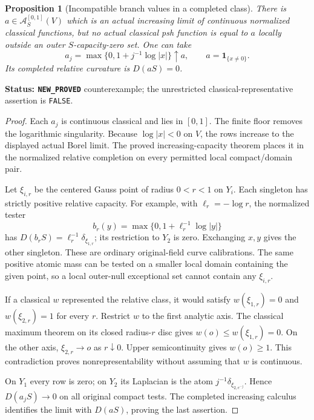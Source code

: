 \documentclass[11pt,a4paper]{article}
\numberwithin{equation}{section}
\newtheorem{proposition}[theorem]{Proposition}
\theoremstyle{definition}
\theoremstyle{remark}
\begin{document}
\begin{proposition}[Incompatible branch values in a completed class]
\label{prop:r3-no-relative-classical-representative}
There is $a\in\mathcal A_S^{[0,1]}(V)$ which is an actual
increasing limit of continuous normalized classical functions,
but no actual classical psh function is equal to $a$ locally
outside an outer $S$-capacity-zero set. One can take
\[
 a_j=\max\{0,1+j^{-1}\log|x|\}\uparrow a,
 \qquad a=\mathbf1_{\{x\ne0\}}.
\]
Its completed relative curvature is $D(aS)=0$.
\end{proposition}

\noindent\textbf{Status: \texttt{NEW\_PROVED}} counterexample;
the unrestricted classical-representative assertion is \texttt{FALSE}.

\begin{proof}
Each $a_j$ is continuous classical and lies in $[0,1]$. The finite
floor removes the logarithmic singularity. Because $\log|x|<0$
on $V$, the rows increase to the displayed actual Borel limit.
The proved increasing-capacity theorem places it in the normalized
relative completion on every permitted local compact/domain pair.

Let $\xi_{i,r}$ be the centered Gauss point of radius $0<r<1$
on $Y_i$. Each singleton has strictly positive relative capacity.
For example, with $\ell_r=-\log r$, the normalized tester
\[
 b_r(y)=\max\{0,1+\ell_r^{-1}\log|y|\}
\]
has $D(b_rS)=\ell_r^{-1}\delta_{\xi_{1,r}}$; its restriction
to $Y_2$ is zero. Exchanging $x,y$ gives the other singleton.
These are ordinary original-field curve calibrations. The same
positive atomic mass can be tested on a smaller local domain
containing the given point, so a local outer-null exceptional set
cannot contain any $\xi_{i,r}$.

If a classical $w$ represented the relative class, it would satisfy
$w(\xi_{1,r})=0$ and $w(\xi_{2,r})=1$ for every $r$. Restrict
$w$ to the first analytic axis. The classical maximum theorem on
its closed radius-$r$ disc gives $w(o)\leq w(\xi_{1,r})=0$.
On the other axis, $\xi_{2,r}\to o$ as $r\downarrow0$.
Upper semicontinuity gives $w(o)\geq1$. This contradiction proves
nonrepresentability without assuming that $w$ is continuous.

On $Y_1$ every row is zero; on $Y_2$ its Laplacian is the atom
$j^{-1}\delta_{\xi_{2,e^{-j}}}$. Hence $D(a_jS)\to0$ on all
original compact tests. The completed increasing calculus identifies
the limit with $D(aS)$, proving the last assertion.
\end{proof}
\end{document}
